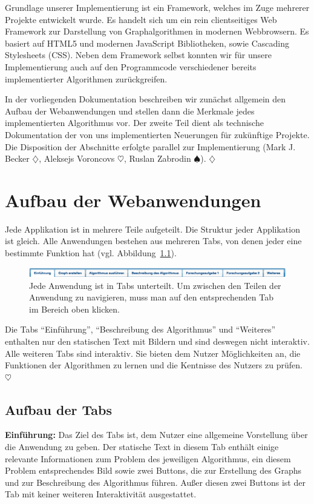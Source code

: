 Grundlage unserer Implementierung ist ein Framework, welches im Zuge mehrerer Projekte entwickelt wurde. Es handelt sich um ein rein clientseitiges Web Framework zur Darstellung von Graphalgorithmen in modernen Webbrowsern. Es basiert auf HTML5 und modernen Java\-Script Bibliotheken, sowie Cascading Stylesheets (CSS). Neben dem Framework selbst konnten wir für unsere Implementierung auch auf den Programmcode verschiedener bereits implementierter Algorithmen zurückgreifen.

In der vorliegenden Dokumentation beschreiben wir zunächst allgemein den Aufbau der Webanwendungen und stellen dann die Merkmale jedes implementierten Algorithmus vor. Der zweite Teil dient als technische Dokumentation der von uns implementierten Neuerungen für zukünftige Projekte. Die Disposition der Abschnitte erfolgte parallel zur Implementierung (Mark J. Becker $\diamondsuit$, Aleksejs Voroncovs $\heartsuit$, Ruslan Zabrodin $\spadesuit$). \hfill$\diamondsuit$

\chapter{Aufbau der Webanwendungen} %
Jede Applikation ist in mehrere Teile aufgeteilt. Die Struktur jeder Applikation ist gleich. Alle Anwendungen bestehen aus mehreren Tabs, von denen jeder eine bestimmte Funktion hat (vgl. Abbildung~\ref{fig:tabs}).

\begin{figure}[h!]
	\centering
	\includegraphics[width=\textwidth]{figures/tabs}
	\caption[Tabs der Anwendung]{Jede Anwendung ist in Tabs unterteilt. Um zwischen den Teilen der Anwendung zu navigieren, muss man auf den entsprechenden Tab im Bereich oben klicken.}\label{fig:tabs}
\end{figure}

Die Tabs \enquote{Einführung}, \enquote{Beschreibung des Algorithmus} und \enquote{Weiteres} enthalten nur den statischen Text mit Bildern und sind deswegen nicht interaktiv. Alle weiteren Tabs sind interaktiv. Sie bieten dem Nutzer Möglichkeiten an, die Funktionen der Algorithmen zu lernen und die Kentnisse des Nutzers zu prüfen. \hfill$\heartsuit$

\section{Aufbau der Tabs} %
\textbf{Einführung:} Das Ziel des Tabs ist, dem Nutzer eine allgemeine Vorstellung über die Anwendung zu geben. Der statische Text in diesem Tab enthält einige relevante Informationen zum Problem des jeweiligen Algorithmus, ein diesem Problem entsprechendes Bild sowie zwei Buttons, die zur Erstellung des Graphs und zur Beschreibung des Algorithmus führen. Außer diesen zwei Buttons ist der Tab mit keiner weiteren Interaktivität ausgestattet.

